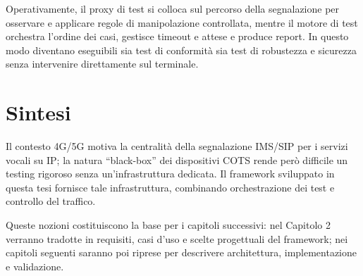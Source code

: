 Operativamente, il proxy di test si colloca sul percorso della segnalazione per osservare e applicare regole di manipolazione controllata, mentre il motore di test orchestra l'ordine dei casi, gestisce timeout e attese e produce report. In questo modo diventano eseguibili sia test di conformit\`a sia test di robustezza e sicurezza senza intervenire direttamente sul terminale.

\section{Sintesi}
Il contesto 4G/5G motiva la centralit\`a della segnalazione IMS/SIP per i servizi vocali su IP; la natura ``black-box'' dei dispositivi COTS rende per\`o difficile un testing rigoroso senza un'infrastruttura dedicata. Il framework sviluppato in questa tesi fornisce tale infrastruttura, combinando orchestrazione dei test e controllo del traffico.

Queste nozioni costituiscono la base per i capitoli successivi: nel Capitolo 2 verranno tradotte in requisiti, casi d'uso e scelte progettuali del framework; nei capitoli seguenti saranno poi riprese per descrivere architettura, implementazione e validazione.
